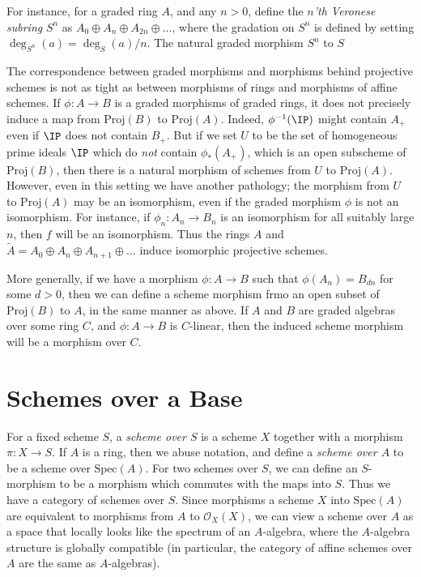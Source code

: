 For instance, for a graded ring $A$, and any $n > 0$, define the \emph{$n$'th Veronese subring} $S^n$ as $A_0 \oplus A_n \oplus A_{2n} \oplus \dots$, where the gradation on $S^n$ is defined by setting $\deg_{S^n}(a) = \deg_S(a)/n$. The natural graded morphism $S^n$ to $S$

The correspondence between graded morphisms and morphisms behind projective schemes is not as tight as between morphisms of rings and morphisms of affine schemes. If $\phi: A \to B$ is a graded morphisms of graded rings, it does not precisely induce a map from $\text{Proj}(B)$ to $\text{Proj}(A)$. Indeed, $\phi^{-1}(\IP)$ might contain $A_+$ even if $\IP$ does not contain $B_+$. But if we set $U$ to be the set of homogeneous prime ideals $\IP$ which do \emph{not} contain $\phi_*(A_+)$, which is an open subscheme of $\text{Proj}(B)$, then there is a natural morphism of schemes from $U$ to $\text{Proj}(A)$. However, even in this setting we have another pathology; the morphism from $U$ to $\text{Proj}(A)$ may be an isomorphism, even if the graded morphism $\phi$ is not an isomorphism. For instance, if $\phi_n: A_n \to B_n$ is an isomorphism for all suitably large $n$, then $f$ will be an isomorphism. Thus the rings $A$ and $\tilde{A} = A_0 \oplus A_n \oplus A_{n+1} \oplus \dots$ induce isomorphic projective schemes.

\begin{remark}
    More generally, if we have a morphism $\phi: A \to B$ such that $\phi(A_n) = B_{dn}$ for some $d > 0$, then we can define a scheme morphism frmo an open subset of $\text{Proj}(B)$ to $A$, in the same manner as above. If $A$ and $B$ are graded algebras over some ring $C$, and $\phi: A \to B$ is $C$-linear, then the induced scheme morphism will be a morphism over $C$.
\end{remark}

















\section{Schemes over a Base}

For a fixed scheme $S$, a \emph{scheme over $S$} is a scheme $X$ together with a morphism $\pi: X \to S$. If $A$ is a ring, then we abuse notation, and define a \emph{scheme over $A$} to be a scheme over $\text{Spec}(A)$. For two schemes over $S$, we can define an $S$-morphism to be a morphism which commutes with the maps into $S$. Thus we have a category of schemes over $S$. Since morphisms a scheme $X$ into $\text{Spec}(A)$ are equivalent to morphisms from $A$ to $\mathcal{O}_X(X)$, we can view a scheme over $A$ as a space that locally looks like the spectrum of an $A$-algebra, where the $A$-algebra structure is globally compatible (in particular, the category of affine schemes over $A$ are the same as $A$-algebras).

